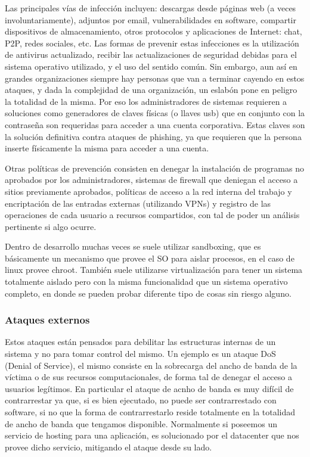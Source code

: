 \documentclass{article}
\begin{document}
Las principales vías de infección incluyen: descargas desde páginas web (a veces involuntariamente), adjuntos por email, vulnerabilidades en software, compartir dispositivos de almacenamiento, otros protocolos y aplicaciones de Internet: chat, P2P, redes sociales, etc. Las formas de prevenir estas infecciones es la utilización de antivirus actualizado, recibir las actualizaciones de seguridad debidas para el sistema operativo utilizado, y el uso del sentido común. Sin embargo, aun así en grandes organizaciones siempre hay personas que van a terminar cayendo en estos ataques, y dada la complejidad de una organización, un eslabón pone en peligro la totalidad de la misma. Por eso los administradores de sistemas requieren a soluciones como generadores de claves físicas (o llaves usb) que en conjunto con la contraseña son requeridas para acceder a una cuenta corporativa. Estas claves son la solución definitiva contra ataques de phishing, ya que requieren que la persona inserte físicamente la misma para acceder a una cuenta.

Otras políticas de prevención consisten en denegar la instalación de programas no aprobados por los administradores, sistemas de firewall que deniegan el acceso a sitios previamente aprobados, políticas de acceso a la red interna del trabajo y encriptación de las entradas externas (utilizando VPNs) y registro de las operaciones de cada usuario a recursos compartidos, con tal de poder un análisis pertinente si algo ocurre.

Dentro de desarrollo muchas veces se suele utilizar sandboxing, que es básicamente un mecanismo que provee el SO para aislar procesos, en el caso de linux provee chroot. También suele utilizarse virtualización para tener un sistema totalmente aislado pero con la misma funcionalidad que un sistema operativo completo, en donde se pueden probar diferente tipo de cosas sin riesgo alguno.

\subsubsection{Ataques externos}

Estos ataques están pensados para debilitar las estructuras internas de un sistema y no para tomar control del mismo. Un ejemplo es un ataque DoS (Denial of Service), el mismo consiste en la sobrecarga del ancho de banda de la víctima o de sus recursos computacionales, de forma tal de denegar el acceso a usuarios legítimos. En particular el ataque de acnho de banda es muy difícil de contrarrestar ya que, si es bien ejecutado, no puede ser contrarrestado con software, si no que la forma de contrarrestarlo reside totalmente en la totalidad de ancho de banda que tengamos disponible. Normalmente si poseemos un servicio de hosting para una aplicación, es solucionado por el datacenter que nos provee dicho servicio, mitigando el ataque desde su lado.
\end{document}
